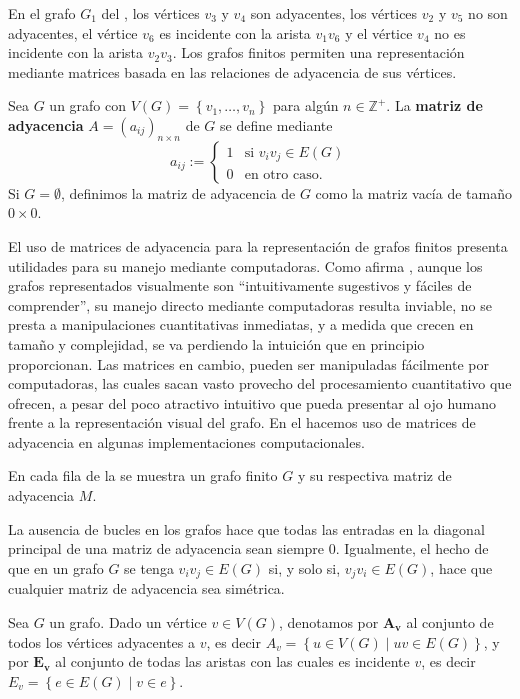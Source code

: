 En el grafo $G_1$ del , los vértices $v_3$ y $v_4$ son adyacentes, los vértices $v_2$ y $v_5$ no son adyacentes, el vértice $v_6$ es incidente con la arista $v_1v_6$ y el vértice $v_4$ no es incidente con la arista $v_2v_3$. Los grafos finitos permiten una representación mediante matrices basada en las relaciones de adyacencia de sus vértices.
\begin{Def}
   Sea $G$ un grafo con $V(G)=\left\lbrace v_1,\dots ,v_n\right\rbrace$ para algún $n\in\mathbb{Z}^+$. La \textbf{matriz de adyacencia} $A=(a_{ij})_{n\times n}$ de $G$ se define mediante
   $$
   a_{ij} := \begin{cases} 
     1 & \text{si } v_iv_j \in E(G) \\ 
     0 & \text{en otro caso.} 
   \end{cases}
   $$
   Si $G=\emptyset$, definimos la matriz de adyacencia de $G$ como la matriz vacía de tamaño $0\times 0$.
\end{Def}
El uso de matrices de adyacencia para la representación de grafos finitos presenta utilidades para su manejo mediante computadoras. Como afirma \cite{marimont1960}, aunque los grafos representados visualmente son ``intuitivamente sugestivos y fáciles de comprender'', su manejo directo mediante computadoras resulta inviable, no se presta a manipulaciones cuantitativas inmediatas, y a medida que crecen en tamaño y complejidad, se va perdiendo la intuición que en principio proporcionan. Las matrices en cambio, pueden ser manipuladas fácilmente por computadoras, las cuales sacan vasto provecho del procesamiento cuantitativo que ofrecen, a pesar del poco atractivo intuitivo que pueda presentar al ojo humano frente a la representación visual del grafo. En el  hacemos uso de matrices de adyacencia en algunas implementaciones computacionales.
\begin{Ejm}
   En cada fila de la  se muestra un grafo finito $G$ y su respectiva matriz de adyacencia $M$.
   
\end{Ejm}
La ausencia de bucles en los grafos hace que todas las entradas en la diagonal principal de una matriz de adyacencia sean siempre $0$. Igualmente, el hecho de que en un grafo $G$ se tenga $v_iv_j\in E(G)$ si, y solo si, $v_jv_i\in E(G)$, hace que cualquier matriz de adyacencia sea simétrica.
\begin{Def}
   Sea $G$ un grafo. Dado un vértice $v\in V(G)$, denotamos por $\bm{A_v}$ al conjunto de todos los vértices adyacentes a $v$, es decir $A_v=\left\lbrace u\in V(G) \mid uv\in E(G)\right\rbrace$, y por $\bm{E_v}$ al conjunto de todas las aristas con las cuales es incidente $v$, es decir $E_v=\left\lbrace e\in E(G)\mid v\in e\right\rbrace$.
\end{Def}
